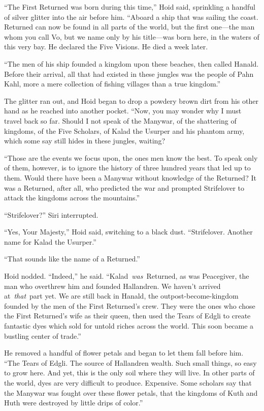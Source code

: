 “The First Returned was born during this time,” Hoid said, sprinkling a handful of silver glitter into the air before him. “Aboard a ship that was sailing the coast. Returned can now be found in all parts of the world, but the first one—the man whom you call Vo, but we name only by his title—was born here, in the waters of this very bay. He declared the Five Visions. He died a week later.

“The men of his ship founded a kingdom upon these beaches, then called Hanald. Before their arrival, all that had existed in these jungles was the people of Pahn Kahl, more a mere collection of fishing villages than a true kingdom.”

The glitter ran out, and Hoid began to drop a powdery brown dirt from his other hand as he reached into another pocket. “Now, you may wonder why I must travel back so far. Should I not speak of the Manywar, of the shattering of kingdoms, of the Five Scholars, of Kalad the Usurper and his phantom army, which some say still hides in these jungles, waiting?

“Those are the events we focus upon, the ones men know the best. To speak only of them, however, is to ignore the history of three hundred years that led up to them. Would there have been a Manywar without knowledge of the Returned? It was a Returned, after all, who predicted the war and prompted Strifelover to attack the kingdoms across the mountains.”

“Strifelover?” Siri interrupted.

“Yes, Your Majesty,” Hoid said, switching to a black dust. “Strifelover. Another name for Kalad the Usurper.”

“That sounds like the name of a Returned.”

Hoid nodded. “Indeed,” he said. “Kalad~\textit{was}~Returned, as was Peacegiver, the man who overthrew him and founded Hallandren. We haven’t arrived at~\textit{that}~part yet. We are still back in Hanald, the outpost-become-kingdom founded by the men of the First Returned’s crew. They were the ones who chose the First Returned’s wife as their queen, then used the Tears of Edgli to create fantastic dyes which sold for untold riches across the world. This soon became a bustling center of trade.”

He removed a handful of flower petals and began to let them fall before him. “The Tears of Edgli. The source of Hallandren wealth. Such small things, so easy to grow here. And yet, this is the only soil where they will live. In other parts of the world, dyes are very difficult to produce. Expensive. Some scholars say that the Manywar was fought over these flower petals, that the kingdoms of Kuth and Huth were destroyed by little drips of color.”

